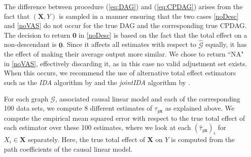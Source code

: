 \documentclass[11pt,a4paper]{article}
\theoremstyle{definition}
\theoremstyle{remark}
\DeclareMathOperator{\possde}{possde}
\newcommand{\g}[1][G]{\mathcal{#1}}
\begin{document}
The difference between procedure (\ref{eq:DAG}) and (\ref{eq:CPDAG}) arises from the fact that $(\mathbf{X},Y)$ is sampled in a manner ensuring that the two cases \eqref{noDesc} and \eqref{noVAS} do not occur for the true DAG and the corresponding true CPDAG.  The decision to return $\boldsymbol{0}$ in \eqref{noDesc} is based on the fact that the total effect on a non-descendant is $\mathbf{0}$. Since it affects all estimates with respect to $\widehat{\g }$ equally, it has the effect of making their average output more similar. We chose to return ``NA" in \eqref{noVAS}, effectively discarding it, as in this case no valid adjustment set exists. When this occurs, we recommend the use of alternative total effect estimators such as the {\em IDA} algorithm by \citet{maathuis2009estimating} and the {\em jointIDA} algorithm by \citet{nandy2017estimating}. 






For each graph $\g$, associated causal linear model and each of the corresponding 100 data sets, we compute 8 different estimates of $\tau_{y\mathbf{x}}$ as explained above. 
We compute the empirical mean squared error with respect to the true total effect of each estimator over these 100 estimates, where we look at each $(\hat{\tau}_{y\mathbf{x}})_i$ for $X_i \in \mathbf{X}$ separately. 
Here, the true total effect of $\mathbf{X}$ on $Y$ is computed from the path coefficients of the causal linear model. 
\end{document}
